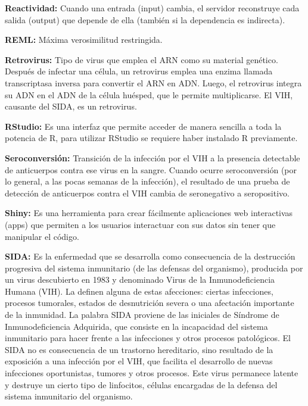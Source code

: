 \textbf{Reactividad: } Cuando una entrada (input) cambia, el servidor reconstruye cada salida (output) que depende de ella (tambi\'en si la dependencia es indirecta).

\textbf{REML: } M\'axima verosimilitud restringida.

\textbf{Retrovirus: } Tipo de virus que emplea el ARN como su material gen\'etico. Despu\'es de infectar una c\'elula, un retrovirus emplea una enzima llamada transcriptasa inversa para convertir el ARN en ADN. Luego, el retrovirus integra su ADN en el ADN de la c\'elula huésped, que le permite multiplicarse. El VIH, causante del SIDA, es un retrovirus.

\textbf{RStudio: } Es una interfaz que permite acceder de manera sencilla a toda la potencia de R, para utilizar RStudio se requiere haber instalado R previamente.

\textbf{Seroconversi\'on: } Transici\'on de la infecci\'on por el VIH a la presencia detectable de anticuerpos contra ese virus en la sangre. Cuando ocurre seroconversi\'on (por lo general, a las pocas semanas de la infecci\'on), el resultado de una prueba de detecci\'on de anticuerpos contra el VIH cambia de seronegativo a seropositivo.

\textbf{Shiny: } Es una herramienta para crear f\'acilmente aplicaciones web interactivas (apps) que permiten a los usuarios interactuar con sus datos sin tener que manipular el c\'odigo.

\textbf{SIDA: } Es la enfermedad que se desarrolla como consecuencia de la destrucci\'on progresiva del sistema inmunitario (de las defensas del organismo), producida por un virus descubierto en 1983 y denominado Virus de la Inmunodeficiencia Humana (VIH). La definen alguna de estas afecciones: ciertas infecciones, procesos tumorales, estados de desnutrici\'on severa o una afectaci\'on importante de la inmunidad. La palabra SIDA proviene de las iniciales de S\'indrome de Inmunodeficiencia Adquirida, que consiste en la incapacidad del sistema inmunitario para hacer frente a las infecciones y otros procesos patol\'ogicos. El SIDA no es consecuencia de un trastorno hereditario, sino resultado de la exposici\'on a una infecci\'on por el VIH, que facilita el desarrollo de nuevas infecciones oportunistas, tumores y otros procesos. Este virus permanece latente y destruye un cierto tipo de linfocitos, c\'elulas encargadas de la defensa del sistema inmunitario del organismo.
 
